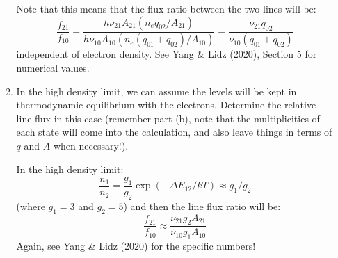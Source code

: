 \documentclass[11pt, preprint]{article}
\begin{document}
\begin{enumerate}
\begin{enumerate}
\begin{answer}
      Note that this means that the flux ratio between the two lines
      will be:
      \begin{equation}
        \frac{f_{21}}{f_{10}} = \frac{h\nu_{21} A_{21}
          \left(n_e q_{02}/A_{21}\right)}
             {h\nu_{10} A_{10} 
          \left(n_e (q_{01} + q_{02}) /A_{10}\right)} = \frac{\nu_{21}
               q_{02}}{\nu_{10} (q_{01} + q_{02})}
      \end{equation}
      independent of electron density. See Yang \& Lidz (2020),
      Section 5 for numerical values.
    \end{answer}
  \item In the high density limit, we can assume the levels will be
    kept in thermodynamic equilibrium with the electrons. Determine
    the relative line flux in this case (remember part (b), note that
    the multiplicities of each state will come into the calculation,
    and also leave things in terms of $q$ and $A$ when necessary!).

    \begin{answer}
      In the high density limit:
      \begin{equation}
        \frac{n_1}{n_2} = \frac{g_1}{g_2} \exp\left(- \Delta E_{12} / k
        T\right) \approx g_1/g_2
      \end{equation}
      (where $g_1=3$ and $g_2=5$) and then the line flux ratio will be:
      \begin{equation}
        \frac{f_{21}}{f_{10}}  \approx \frac{\nu_{21}
          g_2A_{21}}{\nu_{10} g_1 A_{10}}
      \end{equation}
      Again, see Yang \& Lidz (2020) for the specific numbers!
    \end{answer}
\end{enumerate}
\end{enumerate}
\end{document}
